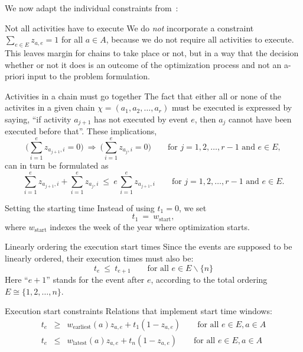 \documentclass[11pt,reqno]{amsart}
\numberwithin{equation}{section}
\begin{document}
We now adapt the individual constraints from~\cite{artigues-etal11}:

\begin{mydesc}

\item[Not all activities have to execute] We do \emph{not} incorporate a constraint
  $\sum_{e\in E} z_{a,e}=1$ for all $a\in A$, because we do not require all activities to
  execute. This leaves margin for chains to take place or not, but in a way that the
  decision whether or not it does is an outcome of the optimization process and not an
  a-priori input to the problem formulation.

\item[Activities in a chain must go together] The fact that either all or none of the
  activites in a given chain $\chi=(a_1,a_2,\dots,a_r)$ must be executed is expressed by
  saying, ``if activity $a_{j+1}$ has not executed by event $e$, then $a_j$ cannot have
  been executed before that''. These implications,
  \[
     \Big(\sum_{i=1}^e z_{a_{j+1},i}=0\Big)
      \ \Longrightarrow \
      \Big(\sum_{i=1}^e z_{a_j,i}=0\Big)
     \qquad\text{for } j=1,2,\dots,r-1
     \text{ and } e\in E,
  \]
  can in turn be formulated as
  \begin{equation}\label{ineq:chain}
    \sum_{i=1}^e z_{a_{j+1},i} + \sum_{i=1}^e z_{a_j, i} 
    \ \le \
    e\, \sum_{i=1}^e z_{a_{j+1}, i}
    \qquad\text{for } j=1,2,\dots, r-1
     \text{ and } e\in E.
  \end{equation}

\item[Setting the starting time] Instead of using $t_1=0$, we set
  \begin{equation}
     t_1
     \ = \
     w_{\text{start}},
  \end{equation}
  where $w_{\text{start}}$ indexes the week of the year where optimization starts. 

\item[Linearly ordering the execution start times] Since the events are supposed to be linearly
  ordered,  their execution times must also be:
  \begin{equation}
     t_e 
     \ \le \
     t_{e+1}
     \qquad\text{for all }
      e\in E\smallsetminus\{n\}
  \end{equation}
  Here ``$e+1$'' stands for the event after $e$, according to the total ordering
  $E\cong\{1,2,\dots,n\}$.

\item[Execution start constraints] Relations that implement start time windows:
  \begin{eqnarray}
    t_e 
    & \ge &
    w_{\text{earliest}}(a) z_{a,e} + t_1 (1-z_{a,e})
    \qquad\text{for all } e\in E, a\in A
    \\
    t_e 
    & \le &
    w_{\text{latest}}(a) z_{a,e} + t_n(1-z_{a,e})
    \qquad\text{for all } e\in E, a\in A
  \end{eqnarray}
  


\end{mydesc}
\end{document}
